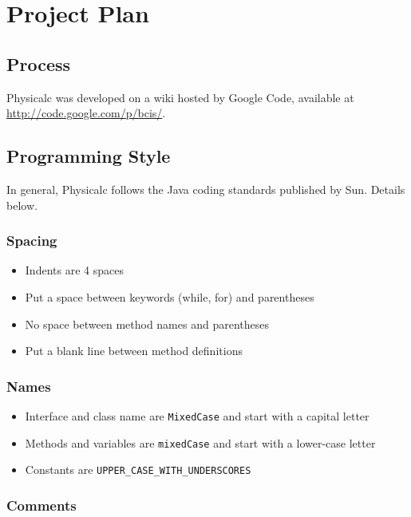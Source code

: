 \chapter{Project Plan}

\section{Process}

Physicalc was developed on a wiki hosted by Google Code, available at \\
\url{http://code.google.com/p/bcis/}.

\section{Programming Style}

In general, Physicalc follows the Java coding standards published by
Sun\cite{javastyle}.  Details below.

\subsection{Spacing}

\begin{itemize}
\item Indents are 4 spaces
\item Put a space between keywords (while, for) and parentheses
\item No space between method names and parentheses
\item Put a blank line between method definitions 
\end{itemize}

\subsection{Names}

\begin{itemize}
\item Interface and class name are \verb|MixedCase| and start with a capital letter
\item Methods and variables are \verb|mixedCase| and start with a lower-case letter
\item Constants are \verb|UPPER_CASE_WITH_UNDERSCORES|
\end{itemize}

\subsection{Comments}

